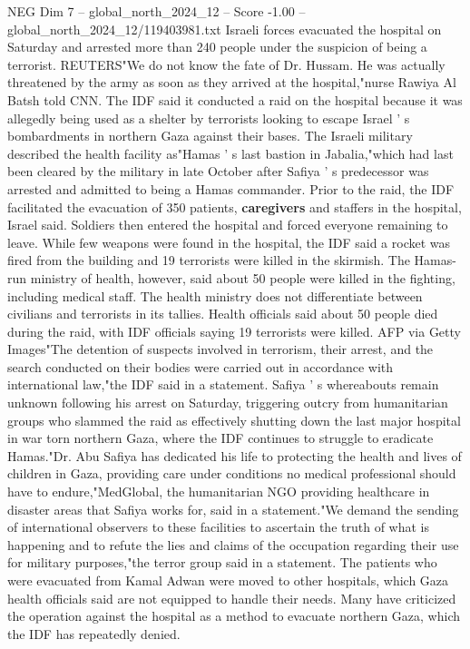 \begin{textsample}{NEG Dim 7 – global\_north\_2024\_12 – Score -1.00 – global\_north\_2024\_12/119403981.txt}  \label{ex:f7_neg_165}
Israeli forces evacuated the hospital on Saturday and arrested more than 240 people under the suspicion of being a terrorist.
REUTERS"We do not know the fate of Dr.
Hussam.
He was actually threatened by the army as soon as they arrived at the hospital,"nurse Rawiya Al Batsh told CNN.
The IDF said it conducted a raid on the hospital because it was allegedly being used as a shelter by terrorists looking to escape Israel ' s bombardments in northern Gaza against their bases.
The Israeli military described the health facility as"Hamas ' s last bastion in Jabalia,"which had last been cleared by the military in late October after Safiya ' s predecessor was arrested and admitted to being a Hamas commander.
Prior to the raid, the IDF facilitated the evacuation of 350 patients, \textbf{caregivers} and staffers in the hospital, Israel said.
Soldiers then entered the hospital and forced everyone remaining to leave.
While few weapons were found in the hospital, the IDF said a rocket was fired from the building and 19 terrorists were killed in the skirmish.
The Hamas-run ministry of health, however, said about 50 people were killed in the fighting, including medical staff.
The health ministry does not differentiate between civilians and terrorists in its tallies.
Health officials said about 50 people died during the raid, with IDF officials saying 19 terrorists were killed.
AFP via Getty Images"The detention of suspects involved in terrorism, their arrest, and the search conducted on their bodies were carried out in accordance with international law,"the IDF said in a statement.
Safiya ' s whereabouts remain unknown following his arrest on Saturday, triggering outcry from humanitarian groups who slammed the raid as effectively shutting down the last major hospital in war torn northern Gaza, where the IDF continues to struggle to eradicate Hamas."Dr.
Abu Safiya has dedicated his life to protecting the health and lives of children in Gaza, providing care under conditions no medical professional should have to endure,"MedGlobal, the humanitarian NGO providing healthcare in disaster areas that Safiya works for, said in a statement."We demand the sending of international observers to these facilities to ascertain the truth of what is happening and to refute the lies and claims of the occupation regarding their use for military purposes,"the terror group said in a statement.
The patients who were evacuated from Kamal Adwan were moved to other hospitals, which Gaza health officials said are not equipped to handle their needs.
Many have criticized the operation against the hospital as a method to evacuate northern Gaza, which the IDF has repeatedly denied.

\end{textsample}
